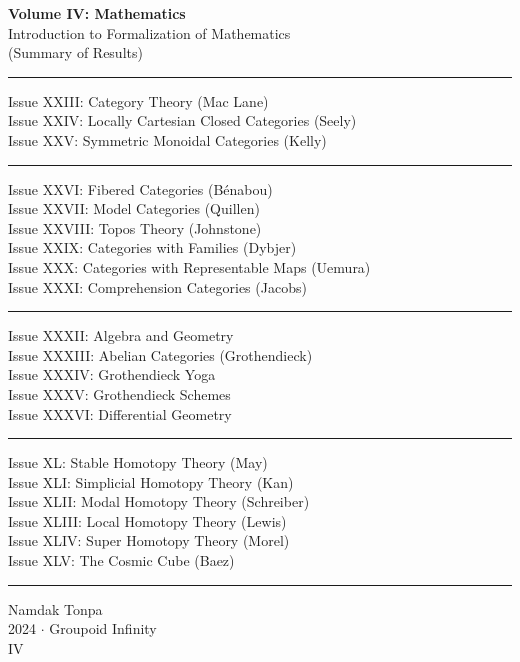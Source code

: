 \documentclass{article}
\begin{document}
\begin{titlepage}
    \centering
    \vspace*{0.5in}
    \Huge
    \textbf{Volume IV: Mathematics} \\
    \LARGE
    Introduction to Formalization of Mathematics \\
    (Summary of Results) \\
    \vspace{1.5in}
    \small
    \flushleft
    \vspace{-2mm} \rule{\textwidth}{0.4pt}
    Issue XXIII: Category Theory (Mac Lane) \\
    Issue XXIV: Locally Cartesian Closed Categories (Seely) \\
    Issue XXV: Symmetric Monoidal Categories (Kelly) \\
    \vspace{-2mm} \rule{\textwidth}{0.4pt}
    Issue XXVI: Fibered Categories (Bénabou) \\
    Issue XXVII: Model Categories (Quillen) \\
    Issue XXVIII: Topos Theory (Johnstone) \\
    Issue XXIX: Categories with Families (Dybjer) \\
    Issue XXX: Categories with Representable Maps (Uemura) \\
    Issue XXXI: Comprehension Categories (Jacobs) \\
    \vspace{-2mm} \rule{\textwidth}{0.4pt}
    Issue XXXII: Algebra and Geometry \\
    Issue XXXIII: Abelian Categories (Grothendieck) \\
    Issue XXXIV: Grothendieck Yoga \\
    Issue XXXV: Grothendieck Schemes \\
    Issue XXXVI: Differential Geometry \\
    \vspace{-2mm} \rule{\textwidth}{0.4pt}
    Issue XL: Stable Homotopy Theory (May) \\
    Issue XLI: Simplicial Homotopy Theory (Kan) \\
    Issue XLII: Modal Homotopy Theory (Schreiber) \\
    Issue XLIII: Local Homotopy Theory (Lewis) \\
    Issue XLIV: Super Homotopy Theory (Morel) \\
    Issue XLV: The Cosmic Cube (Baez) \\
    \vspace{-2mm} \rule{\textwidth}{0.4pt}
    \centering
    \vfill
    \large
    Namdak Tonpa \\
    \Large
    2024 $\cdot$ Groupoid Infinity \\
    IV
\end{titlepage}
\end{document}
